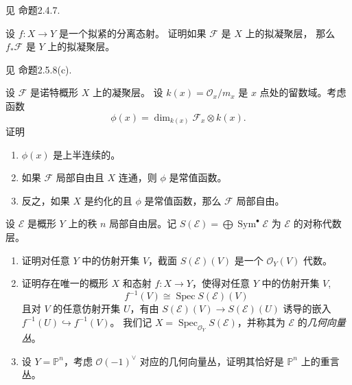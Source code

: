 见 \cite{Har77} 命题2.4.7.


\begin{exercise}[凝聚层]
    设 $f: X \rightarrow Y$ 是一个拟紧的分离态射。
    证明如果 $\mathcal{F}$ 是 $X$ 上的拟凝聚层，
    那么 $f_{*} \mathcal{F}$ 是 $Y$ 上的拟凝聚层。
\end{exercise}

见 \cite{Har77} 命题2.5.8(c).

\begin{exercise}[秩函数]
    设 $\mathcal{F}$ 是诺特概形 $X$ 上的凝聚层。
    设 $k(x)=\mathcal{O}_{x} / m_{x}$ 是 $x$ 点处的留数域。考虑函数
    $$
        \phi(x)=\operatorname{dim}_{k(x)} \mathcal{F}_{x} \otimes k(x).
    $$
    证明
    \begin{enumerate}
        \item $\phi(x)$ 是上半连续的。
        \item 如果 $\mathcal{F}$ 局部自由且 $X$ 连通，则 $\phi$ 是常值函数。
        \item 反之，如果 $X$ 是约化的且 $\phi$ 是常值函数，那么 $\mathcal{F}$ 局部自由。
    \end{enumerate}
\end{exercise}

\begin{exercise}[向量丛]
    设 $\mathcal{E}$ 是概形 $Y$ 上的秩 $n$ 局部自由层。记 $S(\mathcal{E})=\bigoplus \operatorname{Sym}^{\bullet} \mathcal{E}$ 为 $\mathcal{E}$ 的对称代数层。
    \begin{enumerate}
        \item 证明对任意 $Y$ 中的仿射开集 $V$，截面 $S(\mathcal{E})(V)$ 是一个 $\mathcal{O}_{Y}(V)$ 代数。
        \item 证明存在唯一的概形 $X$ 和态射 $f: X \rightarrow Y$，使得对任意 $Y$ 中的仿射开集 $V$,
            $$
                f^{-1}(V) \cong \operatorname{Spec} S(\mathcal{E})(V)
            $$
            且对 $V$ 的任意仿射开集 $U$，有由 $S(\mathcal{E})(V) \rightarrow S(\mathcal{E})(U)$ 诱导的嵌入 $f^{-1}(U) \hookrightarrow f^{-1}(V)$。
            我们记 $X=\operatorname{Spec}_{\mathcal{O}_{Y}} S(\mathcal{E})$，并称其为 $\mathcal{E}$ 的\textit{几何向量丛}。
        \item 设 $Y=\mathbb{P}^{n}$，考虑 $\mathcal{O}(-1)^{\vee}$ 对应的几何向量丛，证明其恰好是 $\mathbb{P}^{n}$ 上的重言丛。
    \end{enumerate}
\end{exercise}

